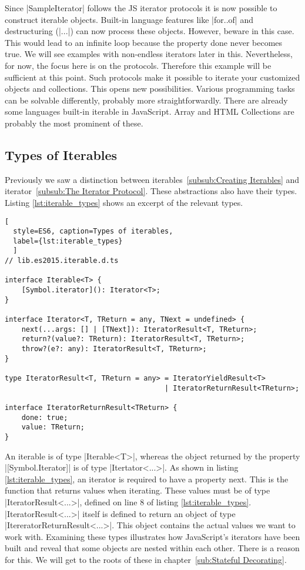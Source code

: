 Since |SampleIterator| follows the JS iterator protocols it is now possible to 
construct iterable objects. Built-in language features like |for..of| and 
destructuring (|...|) can now process these objects. However, beware in this 
case. This would lead to an infinite loop because the property done never 
becomes true. We will see examples with non-endless iterators later in this. 
Nevertheless, for now, the focus here is on the protocols. Therefore this 
example will be sufficient at this point.
\newline
Such protocols make it possible to iterate your customized objects and
collections. This opens new possibilities. Various programming tasks can be 
solvable differently, probably more straightforwardly.\newline
There are already some languages built-in iterable in JavaScript. Array and
HTML Collections are probably the most prominent of these.

\subsection{Types of Iterables}
\label{sub:Types of Iterables}
Previously we saw a distinction between 
iterables~\ref{subsub:Creating Iterables} and 
iterator~\ref{subsub:The Iterator Protocol}. These abstractions also have their 
types. Listing \ref{lst:iterable_types} shows an excerpt of the relevant types.

\begin{lstlisting}[
  style=ES6, caption=Types of iterables,
  label={lst:iterable_types}
  ]
// lib.es2015.iterable.d.ts

interface Iterable<T> {
    [Symbol.iterator](): Iterator<T>;
}

interface Iterator<T, TReturn = any, TNext = undefined> {
    next(...args: [] | [TNext]): IteratorResult<T, TReturn>;
    return?(value?: TReturn): IteratorResult<T, TReturn>;
    throw?(e?: any): IteratorResult<T, TReturn>;
}

type IteratorResult<T, TReturn = any> = IteratorYieldResult<T> 
                                      | IteratorReturnResult<TReturn>;

interface IteratorReturnResult<TReturn> {
    done: true;
    value: TReturn;
}
\end{lstlisting}

An iterable is of type |Iterable<T>|, whereas the object returned by the property
|[Symbol.Iterator]| is of type |Itertator<...>|. As shown in listing
\ref{lst:iterable_types}, an iterator is required to have a property next. 
This is the function that returns values when iterating. These values must be 
of type |IteratorResult<...>|, defined on line 8 of listing 
\ref{lst:iterable_types}. |IteratorResult<...>| itself is defined to return an 
object of type |ItereratorReturnResult<...>|. This object contains the actual 
values we want to work with. Examining these types illustrates how JavaScript's 
iterators have been built and reveal that some objects are nested within each
other. There is a reason for this. We will get to the roots of these in
chapter~\ref{sub:Stateful Decorating}.

